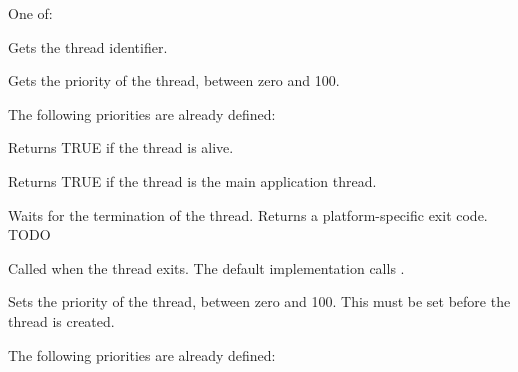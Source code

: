 
One of:

\twocolwidtha{7cm}
\begin{twocollist}\itemsep=0pt
\end{twocollist}

\label{wxthreadgetid}


Gets the thread identifier.

\label{wxthreadgetpriority}


Gets the priority of the thread, between zero and 100.

The following priorities are already defined:

\twocolwidtha{7cm}
\begin{twocollist}\itemsep=0pt
\end{twocollist}

\label{wxthreadisalive}


Returns TRUE if the thread is alive.

\label{wxthreadismain}


Returns TRUE if the thread is the main application thread.

\label{wxthreadjoin}


Waits for the termination of the thread. Returns a platform-specific exit code. TODO

\label{wxthreadonexit}


Called when the thread exits. The default implementation calls .

\label{wxthreadsetpriority}


Sets the priority of the thread, between zero and 100. This must be set before the thread is created.

The following priorities are already defined:

\twocolwidtha{7cm}
\begin{twocollist}\itemsep=0pt
\end{twocollist}


